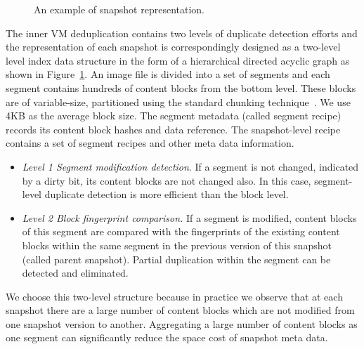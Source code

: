 \begin{figure}[htbp]
  \centering
  \caption{An example  of snapshot representation.}
  \label{fig:snapshot}
\end{figure}

The inner VM deduplication contains two levels of duplicate detection efforts and the representation of
each snapshot is correspondingly designed as a two-level level index data structure in the form of a hierarchical
directed acyclic graph as shown in Figure~\ref{fig:snapshot}.
An image file is divided into a set of segments and each  segment contains hundreds of content blocks from the bottom level.
These blocks are of variable-size, partitioned using
the standard chunking technique~\cite{similar94}.  We use 4KB as the average block size. 
The segment metadata (called segment recipe) records its  content block hashes and  data reference. 
The snapshot-level recipe contains a set of  segment recipes and other meta data information.
\begin{itemize}
\item {\em Level 1 Segment modification  detection}.
If a segment is not changed, indicated by a dirty bit, its content blocks are not changed also. In this case,
 segment-level duplicate detection is more efficient than the block level. 

\item {\em Level 2  Block fingerprint comparison.}
If a segment is modified, content blocks of this segment are compared with 
the fingerprints of the existing content blocks within the same segment in
the previous version of this snapshot (called parent  snapshot). Partial duplication
within the segment can be detected and eliminated. 
\end{itemize}

We choose this two-level structure because in practice we observe that at each snapshot there are a large
number of content blocks which are not modified from one snapshot version to another.
Aggregating a large number of content blocks as one segment can significantly
reduce the space cost of snapshot meta data. 

